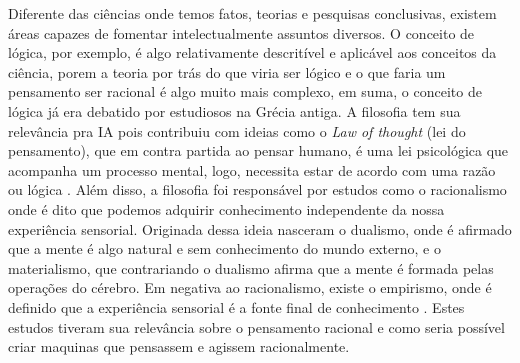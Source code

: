 Diferente das ciências onde temos fatos, teorias e pesquisas conclusivas, existem áreas capazes de fomentar intelectualmente assuntos diversos. O conceito de lógica, por exemplo, é algo relativamente descritível e aplicável aos conceitos da ciência, porem a teoria por trás do que viria ser lógico e o que faria um pensamento ser racional é algo muito mais complexo, em suma, o conceito de lógica já era debatido por estudiosos na Grécia antiga. A filosofia tem sua relevância pra IA pois contribuiu com ideias como o \textit{Law of thought} (lei do pensamento), que em contra partida ao pensar humano, é uma lei psicológica que acompanha um processo mental, logo, necessita estar de acordo com uma razão ou lógica \cite{frege1956thought, russell2003artificial}. Além disso, a filosofia foi responsável por estudos como o racionalismo onde é dito que podemos adquirir conhecimento independente da nossa experiência sensorial. Originada dessa ideia nasceram o dualismo, onde é afirmado que a mente é algo natural e sem conhecimento do mundo externo, e o materialismo, que contrariando o dualismo afirma que a mente é formada pelas operações do cérebro. Em negativa ao racionalismo, existe o empirismo, onde é definido que a experiência sensorial é a fonte final de conhecimento \cite[6]{rationalismvsempiricism, descartes2013rene, russell2003artificial}. Estes estudos tiveram sua relevância sobre o pensamento racional e como seria possível criar maquinas que pensassem e agissem racionalmente.
